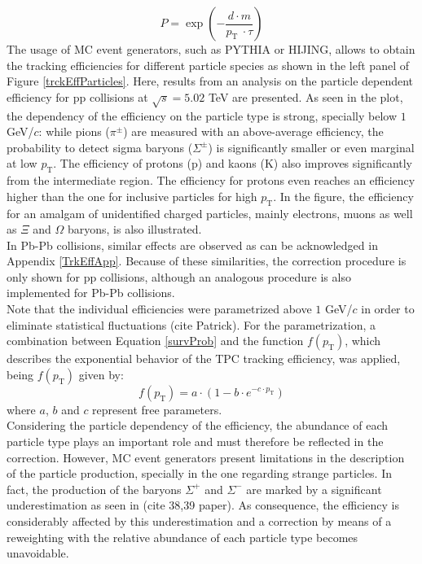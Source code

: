 \documentclass[12pt,a4paper]{report}
\begin{document}
\begin{equation}
P = \exp{\left(-\dfrac{d\cdot m}{p_\text{T } \cdot \tau}\right)}
\label{survProb}
\end{equation}
The usage of MC event generators, such as PYTHIA or HIJING, allows to obtain the tracking efficiencies for different particle species as shown in the left panel of Figure \ref{trckEffParticles}. Here, results from  an analysis on the particle dependent efficiency for pp collisions at $\sqrt{s} = 5.02$ TeV are presented. As seen in the plot, the dependency of the efficiency on the particle type is strong, specially below $1$ GeV/$c$: while pions ($\pi^{\pm}$) are measured with an above-average efficiency, the probability to detect sigma baryons ($\Sigma^{\pm}$) is significantly smaller or even marginal at low $p_\text{T}$. The efficiency of protons ($\text{p}$) and kaons ($\text{K}$) also improves significantly from the intermediate \pt region. The efficiency for protons even reaches an efficiency higher than the one for inclusive particles for high $p_\text{T}$. In the figure, the efficiency for an amalgam of unidentified charged particles, mainly electrons, muons as well as $\Xi$ and $\Omega$ baryons, is also illustrated.\\
In Pb-Pb collisions, similar effects are observed as can be acknowledged in Appendix \ref{TrkEffApp}. Because of these similarities, the correction procedure is only shown for pp collisions, although an analogous procedure is also implemented for Pb-Pb collisions.\\
Note that the individual efficiencies were parametrized above $1$ GeV/$c$ in order to eliminate statistical fluctuations (cite Patrick). For the parametrization, a combination between Equation \ref{survProb} and the function $f(p_\text{T}) $, which describes the exponential behavior of the TPC tracking efficiency, was applied, being $f(p_\text{T})$ given by:
\begin{equation}
f(p_\text{T}) = a\cdot(1-b\cdot e^{-c \cdot p_\text{T}})
\label{functionEff}
\end{equation}
where $a$, $b$ and $c$ represent free parameters.\\
Considering the particle dependency of the efficiency, the abundance of each particle type plays an important role and must therefore be reflected in the correction. However, MC event generators present limitations in the description of the particle production, specially in the one regarding strange particles. In fact, the production of the baryons $\Sigma^{+}$ and $\Sigma^{-}$ are marked by a significant underestimation as seen in (cite 38,39 paper). As consequence, the efficiency is considerably affected by this underestimation and a correction by means of a reweighting with the relative abundance of each particle type becomes unavoidable. \\
\end{document}
